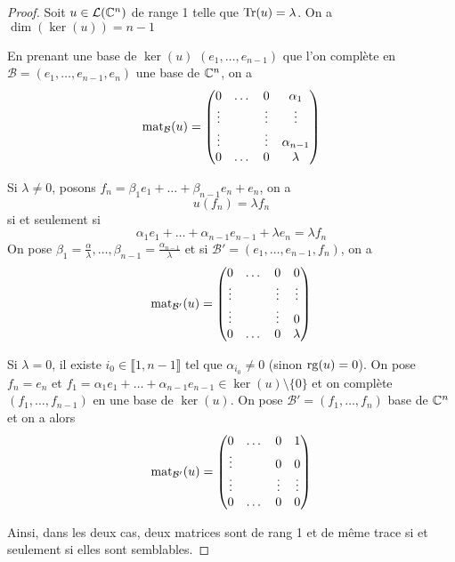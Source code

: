 \documentclass[12pt]{article}
\begin{document}
\begin{proof}
    Soit $u\in\mathcal{L}(\mathbb{C}^{n})$ de range 1 telle que $\operatorname{Tr}(u)=\lambda$. On a $\dim(\ker(u))=n-1$

    En prenant une base de $\ker(u)$ $(e_{1},\dots,e_{n-1})$ que l'on complète en $\mathcal{B}=(e_{1},\dots,e_{n-1},e_{n})$ une base de $\mathbb{C}^{n}$, on a 
    \begin{equation}
        \operatorname{mat}_{\mathcal{B}}(u)
        =
        \begin{pmatrix}
            0 & \dots & 0 & \alpha_{1}\\
            \vdots & & \vdots &\vdots\\
            \vdots & & \vdots &\alpha_{n-1}\\
            0 & \dots & 0& \lambda
        \end{pmatrix}
    \end{equation}

    Si $\lambda\neq0$, posons $f_{n}=\beta_{1}e_{1}+\dots+\beta_{n-1}e_{n}+e_{n}$, on a 
    \begin{equation}
        u(f_{n})=\lambda f_{n}
    \end{equation}
    si et seulement si
    \begin{equation}
        \alpha_{1}e_{1}+\dots+\alpha_{n-1}e_{n-1}+\lambda e_{n}=\lambda f_{n}
    \end{equation}
    On pose $\beta_{1}=\frac{\alpha}{\lambda},\dots,\beta_{n-1}=\frac{\alpha_{n-1}}{\lambda}$ et si $\mathcal{B}'=(e_{1},\dots,e_{n-1},f_{n})$, on a 
    \begin{equation}
        \operatorname{mat}_{\mathcal{B}'}(u)=
        \begin{pmatrix}
            0 & \dots & 0 & 0\\
            \vdots & & \vdots &\vdots\\
            \vdots & & \vdots &0\\
            0 & \dots & 0& \lambda
        \end{pmatrix}
    \end{equation}

    Si $\lambda=0$, il existe $i_{0}\in\llbracket 1,n-1\rrbracket$ tel que $\alpha_{i_{0}}\neq0$ (sinon $\operatorname{rg}(u)=0$). On pose $f_{n}=e_{n}$ et $f_{1}=\alpha_{1}e_{1}+\dots+\alpha_{n-1}e_{n-1}\in\ker(u)\setminus\lbrace0\rbrace$ et on complète $(f_{1},\dots,f_{n-1})$ en une base de $\ker(u)$. On pose $\mathcal{B}'=(f_{1},\dots,f_{n})$ base de $\mathbb{C}^{n}$ et on a alors 
    \begin{equation}
        \operatorname{mat}_{\mathcal{B}'}(u)=
        \begin{pmatrix}
            0 & \dots & 0 & 1\\
            \vdots & & 0 &0\\
            \vdots & & \vdots &\vdots\\
            0 & \dots & 0& 0
        \end{pmatrix}
    \end{equation}

    Ainsi, dans les deux cas, deux matrices sont de rang 1 et de même trace si et seulement si elles sont semblables.
\end{proof}
\end{document}
